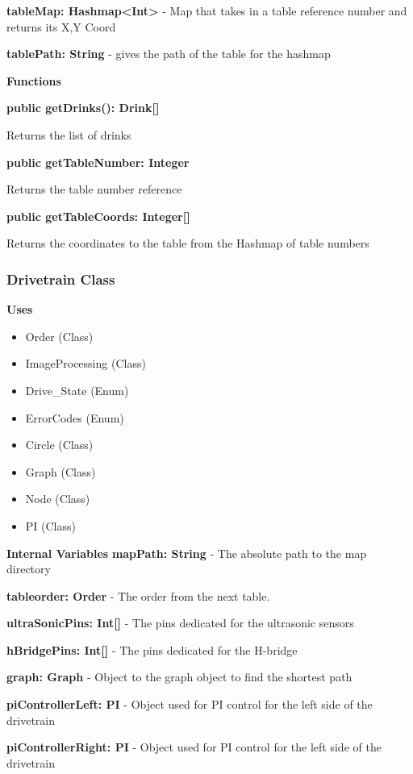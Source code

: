 \documentclass [10pt]{article}
\begin{document}
\textbf{tableMap: Hashmap<Int>} -  Map that takes in a table reference number and returns its X,Y Coord

\textbf{tablePath: String} - gives the path of the table for the hashmap 

\textbf{Functions}

\textbf{public getDrinks(): Drink[]}

Returns the list of drinks

\textbf{public getTableNumber: Integer}

Returns the table number reference

\textbf{public getTableCoords: Integer[]}

Returns the coordinates to the table from the Hashmap of table numbers



\subsubsection{Drivetrain Class}
\textbf{Uses}
\begin{itemize}
	\item Order (Class)
	\item ImageProcessing (Class)
	\item Drive\_State (Enum)
	\item ErrorCodes (Enum)
	\item Circle (Class)
	\item Graph (Class)
	\item Node (Class)
	\item PI (Class)
\end{itemize}


\textbf{Internal Variables}
\textbf{mapPath: String} - The absolute path to the map directory

\textbf{tableorder: Order} - The order from the next table.

\textbf{ultraSonicPins: Int[]} - The pins dedicated for the ultrasonic sensors

\textbf{hBridgePins: Int[]} - The pins dedicated for the H-bridge

\textbf{graph: Graph} - Object to the graph object to find the shortest path

\textbf{piControllerLeft: PI} - Object used for PI control for the left side of the drivetrain

\textbf{piControllerRight: PI} - Object used for PI control for the left side of the drivetrain
\end{document}
